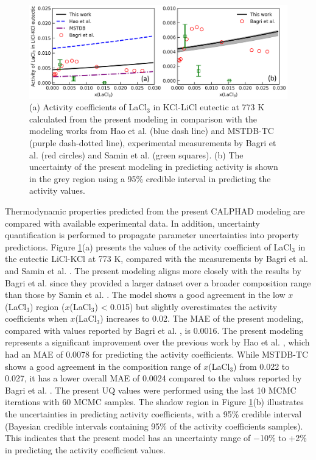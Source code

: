 \begin{figure} [H]
    \centering
    \includegraphics[width=1\linewidth]{moltensalts/Moltensalts-LaCl3-Gamma-Ternary-UQ.png}
    \caption{(a) Activity coefficients of LaCl$_3$ in KCl-LiCl eutectic at 773 K calculated from the present modeling in comparison with the modeling works from Hao et al. \cite{hao2024thermodynamic} (blue dash line) and MSTDB-TC \cite{ard2022development} (purple dash-dotted line), experimental measurements by Bagri et al. \cite{bagri2016determination} (red circles) and Samin et al. \cite{samin2016estimation} (green squares). (b) The uncertainty of the present modeling in predicting activity is shown in the grey region using a 95\% credible interval in predicting the activity values.}
    \label{ms:fig:lacl3ternaryGammaUQ}
\end{figure}

Thermodynamic properties predicted from the present CALPHAD modeling are compared with available experimental data. In addition, uncertainty quantification is performed to propagate parameter uncertainties into property predictions. Figure \ref{ms:fig:lacl3ternaryGammaUQ}(a) presents the values of the activity coefficient of LaCl$_3$ in the eutectic LiCl-KCl at 773 K, compared with the measurements by Bagri et al. \cite{bagri2016determination} and Samin et al. \cite{samin2016estimation}. The present modeling aligns more closely with the results by Bagri et al. \cite{bagri2016determination} since they provided a larger dataset over a broader composition range than those by Samin et al. \cite{samin2016estimation}. The model shows a good agreement in the low $x$(LaCl$_3$) region ($x$(LaCl$_3$) < 0.015) but slightly overestimates the activity coefficients when $x$(LaCl$_3$) increases to 0.02. The MAE of the present modeling, compared with values reported by Bagri et al. \cite{bagri2016determination}, is 0.0016. The present modeling represents a significant improvement over the previous work by Hao et al. \cite{hao2024thermodynamic}, which had an MAE of 0.0078 for predicting the activity coefficients. While MSTDB-TC \cite{ard2022development} shows a good agreement in the composition range of $x$(LaCl$_3$) from 0.022 to 0.027, it has a lower overall MAE of 0.0024 compared to the values reported by Bagri et al. \cite{bagri2016determination}. The present UQ values were performed using the last 10 MCMC iterations with 60 MCMC samples. The shadow region in Figure \ref{ms:fig:lacl3ternaryGammaUQ}(b) illustrates the uncertainties in predicting activity coefficients, with a 95\% credible interval (Bayesian credible intervals containing 95\% of the activity coefficients samples). This indicates that the present model has an uncertainty range of $-$10\% to +2\% in predicting the activity coefficient values.

